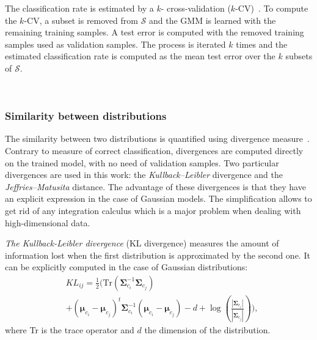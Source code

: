 \documentclass[journal,peerreview,onecolumn]{IEEEtran}
\begin{document}
        The classification rate is  estimated by a $k$- cross-validation ($k$-CV)~\cite{opac-b1127878}.  To compute  the $k$-CV, a subset is removed  from $\mathcal{S}$ and  the GMM is learned  with the remaining training samples.   A test error is  computed with the removed  training  samples  used  as  validation  samples.   The process is  iterated $k$ times and  the estimated classification rate is computed as the mean  test error over the $k$ subsets of $\mathcal{S}$.

        \hspace{0pt} \\

        \subsubsection{Similarity between distributions}
        The similarity  between two distributions is  quantified using
        divergence  measure~\cite{opac-b1097517}. Contrary  to measure
        of correct  classification, divergences are  computed directly
        on the trained model, with no need of validation samples.  Two
        particular   divergences   are   used  in   this   work:   the
        \emph{Kullback–Leibler}        divergence       and        the
        \emph{Jeffries–Matusita}  distance.  The  advantage  of  these
        divergences is  that they have  an explicit expression  in the
        case of Gaussian models. The  simplification allows to get rid
        of  any integration  calculus which  is a  major problem  when
        dealing with high-dimensional data.

        \emph{The   Kullback-Leibler   divergence}   (KL   divergence)
        measures  the  amount  of  information  lost  when  the  first
        distribution     is     approximated     by     the     second
        one\cite{kullback1987letter}. It can be explicitly computed in
        the case of Gaussian distributions:
        \begin{align}
            &KL_{ij} = \frac{1}{2} \biggl( \text{Tr} (\boldsymbol{\Sigma}_{c_i}^{-1} \boldsymbol{\Sigma}_{c_j}) \nonumber \\
            & + (\boldsymbol{\mu}_{c_i} - \boldsymbol{\mu}_{c_j})^t \boldsymbol{\Sigma}_{c_i}^{-1} (\boldsymbol{\mu}_{c_i} - \boldsymbol{\mu}_{c_j}) - d + \log \left( \frac{|\boldsymbol{\Sigma}_{c_i}|}{|\boldsymbol{\Sigma}_{c_j}|} \right) \biggr),
        \end{align}
        where Tr is the trace operator and $d$ the dimension of the distribution.
\end{document}
